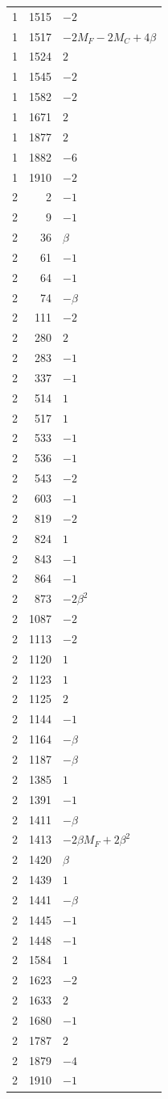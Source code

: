 \begin{longtable}{@{}rrl@{}}
1 & 1515 & $-2$\\
1 & 1517 & $-2M_F-2M_C+4\beta$\\
1 & 1524 & $2$\\
1 & 1545 & $-2$\\
1 & 1582 & $-2$\\
1 & 1671 & $2$\\
1 & 1877 & $2$\\
1 & 1882 & $-6$\\
1 & 1910 & $-2$\\
2 & 2 & $-1$\\
2 & 9 & $-1$\\
2 & 36 & $\beta$\\
2 & 61 & $-1$\\
2 & 64 & $-1$\\
2 & 74 & $-\beta$\\
2 & 111 & $-2$\\
2 & 280 & $2$\\
2 & 283 & $-1$\\
2 & 337 & $-1$\\
2 & 514 & $1$\\
2 & 517 & $1$\\
2 & 533 & $-1$\\
2 & 536 & $-1$\\
2 & 543 & $-2$\\
2 & 603 & $-1$\\
2 & 819 & $-2$\\
2 & 824 & $1$\\
2 & 843 & $-1$\\
2 & 864 & $-1$\\
2 & 873 & $-2\beta^{2}$\\
2 & 1087 & $-2$\\
2 & 1113 & $-2$\\
2 & 1120 & $1$\\
2 & 1123 & $1$\\
2 & 1125 & $2$\\
2 & 1144 & $-1$\\
2 & 1164 & $-\beta$\\
2 & 1187 & $-\beta$\\
2 & 1385 & $1$\\
2 & 1391 & $-1$\\
2 & 1411 & $-\beta$\\
2 & 1413 & $-2\beta M_F+2\beta^{2}$\\
2 & 1420 & $\beta$\\
2 & 1439 & $1$\\
2 & 1441 & $-\beta$\\
2 & 1445 & $-1$\\
2 & 1448 & $-1$\\
2 & 1584 & $1$\\
2 & 1623 & $-2$\\
2 & 1633 & $2$\\
2 & 1680 & $-1$\\
2 & 1787 & $2$\\
2 & 1879 & $-4$\\
2 & 1910 & $-1$\\
\end{longtable}
\normalsize
